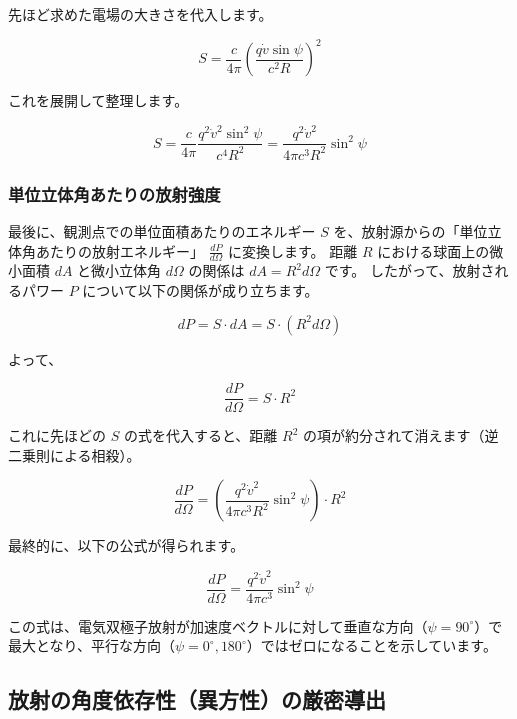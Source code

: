 \documentclass[a4paper,11pt]{bxjsarticle} %
\begin{document}
先ほど求めた電場の大きさを代入します。

\begin{equation}
    S = \frac{c}{4\pi} \left( \frac{q \dot{v} \sin\psi}{c^2 R} \right)^2
\end{equation}

これを展開して整理します。

\begin{equation}
    S = \frac{c}{4\pi} \frac{q^2 \dot{v}^2 \sin^2\psi}{c^4 R^2} = \frac{q^2 \dot{v}^2}{4\pi c^3 R^2} \sin^2\psi
\end{equation}

\subsubsection{単位立体角あたりの放射強度}

最後に、観測点での単位面積あたりのエネルギー $S$ を、放射源からの「単位立体角あたりの放射エネルギー」 $\frac{dP}{d\Omega}$ に変換します。
距離 $R$ における球面上の微小面積 $dA$ と微小立体角 $d\Omega$ の関係は $dA = R^2 d\Omega$ です。
したがって、放射されるパワー $P$ について以下の関係が成り立ちます。

\begin{equation}
    dP = S \cdot dA = S \cdot (R^2 d\Omega)
\end{equation}

よって、

\begin{equation}
    \frac{dP}{d\Omega} = S \cdot R^2
\end{equation}

これに先ほどの $S$ の式を代入すると、距離 $R^2$ の項が約分されて消えます（逆二乗則による相殺）。

\begin{equation}
    \frac{dP}{d\Omega} = \left( \frac{q^2 \dot{v}^2}{4\pi c^3 R^2} \sin^2\psi \right) \cdot R^2
\end{equation}

最終的に、以下の公式が得られます。

\begin{equation}
    \frac{dP}{d\Omega} = \frac{q^2 \dot{v}^2}{4\pi c^3} \sin^2\psi
\end{equation}

この式は、電気双極子放射が加速度ベクトルに対して垂直な方向（$\psi = 90^\circ$）で最大となり、平行な方向（$\psi = 0^\circ, 180^\circ$）ではゼロになることを示しています。

\subsection{放射の角度依存性（異方性）の厳密導出}
\end{document}

